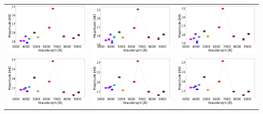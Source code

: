 \begin{table}
\begin{tabular}{ccc}
\includegraphics[width=0.3\linewidth, clip]{photopectrum_splus_MC0116-015280_aper.pdf} & \includegraphics[width=0.3\linewidth, clip]{photopectrum_splus_MC0116-015280_auto.pdf} & \includegraphics[width=0.3\linewidth, clip]{photopectrum_splus_MC0116-015280_petro.pdf} \\
\includegraphics[width=0.3\linewidth, clip]{photopectrum_splus_MC0116-172101_aper.pdf} & \includegraphics[width=0.3\linewidth, clip]{photopectrum_splus_MC0116-172101_auto.pdf} & \includegraphics[width=0.3\linewidth, clip]{photopectrum_splus_MC0116-172101_petro.pdf} \\

\end{tabular}
\end{table}
